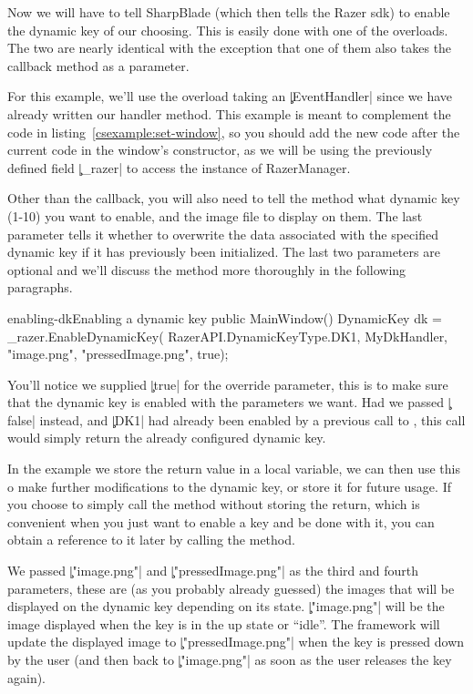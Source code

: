 Now we will have to tell SharpBlade (which then tells the Razer \gls{sdk}) to enable the dynamic key of our choosing. This is easily done with one of the  overloads. The two are nearly identical with the exception that one of them also takes the callback method as a parameter.

For this example, we'll use the overload taking an \c|EventHandler| since we have already written our handler method. This example is meant to complement the code in listing~\ref{csexample:set-window}, so you should add the new code after the current code in the window's constructor, as we will be using the previously defined field \c|_razer| to access the instance of RazerManager.

Other than the callback, you will also need to tell the method what dynamic key (1-10) you want to enable, and the image file to display on them. The last parameter tells it whether to overwrite the data associated with the specified dynamic key if it has previously been initialized. The last two parameters are optional and we'll discuss the method more thoroughly in the following paragraphs.

\begin{csexample}{enabling-dk}{Enabling a dynamic key}
public MainWindow()
{
    DynamicKey dk = _razer.EnableDynamicKey(
        RazerAPI.DynamicKeyType.DK1,
        MyDkHandler,
        "image.png",
        "pressedImage.png",
        true);
}
\end{csexample}

You'll notice we supplied \c|true| for the override parameter, this is to make sure that the dynamic key is enabled with the parameters we want. Had we passed \c|false| instead, and \c|DK1| had already been enabled by a previous call to , this call would simply return the already configured dynamic key.

In the example we store the return value in a local variable, we can then use this o make further modifications to the dynamic key, or store it for future usage. If you choose to simply call the method without storing the return, which is convenient when you just want to enable a key and be done with it, you can obtain a reference to it later by calling the  method.

We passed \c|"image.png"| and \c|"pressedImage.png"| as the third and fourth parameters, these are (as you probably already guessed) the images that will be displayed on the dynamic key depending on its state. \c|"image.png"| will be the image displayed when the key is in the up state or ``idle''. The framework will update the displayed image to \c|"pressedImage.png"| when the key is pressed down by the user (and then back to \c|"image.png"| as soon as the user releases the key again).

